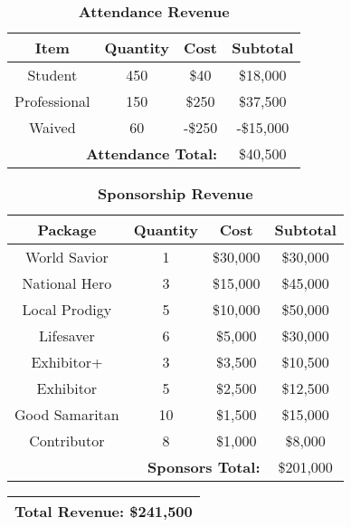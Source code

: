 \clearpage
\begin{table}[H]
\centering
\caption*{\textbf{Attendance Revenue}}
\begin{tabular}{|c|c|c|c|}
\hline
    \textbf{Item} & \textbf{Quantity} & \textbf{Cost} & \textbf{Subtotal}	\\ 
\hline
	Student			&	450	&	\$40	&	\$18,000						\\
	Professional	&	150	& 	\$250	&	\$37,500						\\
	Waived			&	60	& 	-\$250	&	-\$15,000						\\
\hline
	\multicolumn{3}{|r|}{\textbf{Attendance Total:}}	&	\$40,500		\\
\hline
\end{tabular}
\end{table}


\begin{table}[H]
\centering
\caption*{\textbf{Sponsorship Revenue}}
\begin{tabular}{|c|c|c|c|}
\hline
    \textbf{Package} & \textbf{Quantity} & \textbf{Cost} & \textbf{Subtotal}	\\ 
\hline
	World Savior	&	1	&	\$30,000	&	\$30,000						\\
	National Hero	&	3	& 	\$15,000	&	\$45,000						\\
	Local Prodigy	&	5	& 	\$10,000	&	\$50,000						\\
	Lifesaver		&	6	& 	\$5,000		&	\$30,000						\\
	Exhibitor+		&	3	& 	\$3,500		&	\$10,500						\\
	Exhibitor		&	5	& 	\$2,500		&	\$12,500						\\
	Good Samaritan	&	10	& 	\$1,500		&	\$15,000						\\
	Contributor		&	8	& 	\$1,000		&	\$8,000							\\
\hline
	\multicolumn{3}{|r|}{\textbf{Sponsors Total:}}	&	\$201,000				\\
\hline
\end{tabular}
\end{table}


\begin{table}[H]
\centering
\begin{tabular}{|c|}
\hline
    \textbf{Total Revenue: \$241,500}\\ 
\hline
\end{tabular}
\end{table}

